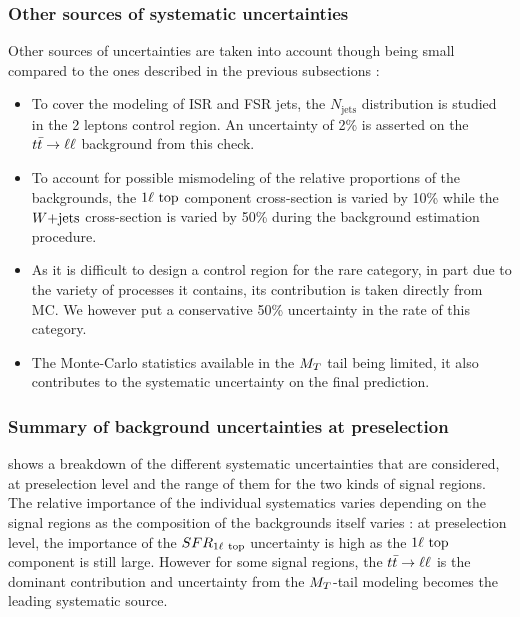             \subsubsection{Other sources of systematic uncertainties}

            Other sources of uncertainties are taken into account though being small compared
            to the ones described in the previous subsections :
            \begin{itemize}
                \item To cover the modeling of ISR and FSR jets, the $N_\text{jets}$
                      distribution is studied in the 2 leptons control region. An
                      uncertainty of 2\% is asserted on the $t\bar{t} \rightarrow \ell \ell$ background
                      from this check.
                \item To account for possible mismodeling of the relative proportions of
                      the backgrounds, the $1\ell~\text{top}$ component cross-section
                      is varied by 10\% while the $\text{$W$+jets}$ cross-section is varied by 50\%
                      during the background estimation procedure.
                \item As it is difficult to design a control region for the rare category,
                      in part due to the variety of processes it contains, its contribution
                      is taken directly from MC. We however put a conservative 50\% uncertainty
                      in the rate of this category.
                \item The Monte-Carlo statistics available in the $M_T$ tail being limited,
                      it also contributes to the systematic uncertainty on the final prediction.
            \end{itemize}

            \subsubsection{Summary of background uncertainties at preselection}

             shows a breakdown of the different systematic
            uncertainties that are considered, at preselection level and the range of them
            for the two kinds of signal regions. The relative importance of the individual
            systematics varies depending on the signal regions as the composition of the
            backgrounds itself varies : at preselection level, the importance of the
            $SFR_{1\ell~\text{top}}$ uncertainty is high as the $1\ell~\text{top}$ component is still large.
            However for some signal regions, the $t\bar{t} \rightarrow \ell \ell$ is the dominant contribution and
            uncertainty from the $M_T$-tail modeling becomes the leading systematic source.

